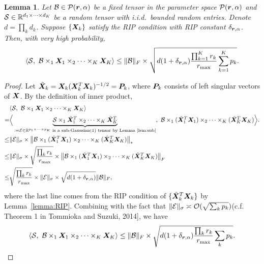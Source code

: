 \documentclass[11pt]{article}
\theoremstyle{plain}
\newtheorem{lem}{Lemma}
\theoremstyle{definition}
\newcommand*{\KeepStyleUnderBrace}[1]{%
  \mathop{%
    \mathchoice
    {\underbrace{\displaystyle#1}}%
    {\underbrace{\textstyle#1}}%
    {\underbrace{\scriptstyle#1}}%
    {\underbrace{\scriptscriptstyle#1}}%
  }\limits
}
\begin{document}
\begin{lem}\label{lem}
Let $\mathcal{B}\in\mathcal{P}(\bm{r},\alpha)$ be a fixed tensor in the parameter space $\mathcal{P}(\bm{r}, \alpha)$ and $\mathcal{S}\in\mathbb{R}^{d_1\times \cdots \times d_K}$ be a random tensor with i.i.d.\ bounded random entries. Denote $d=\prod_k d_k$. Suppose $\{\bm X_k\}$ satisfy the RIP condition with RIP constant $\delta_{\bm{r}, \alpha}$. Then, with very high probability,
\[
\langle \mathcal{S},\ \mathcal{B}\times_1\bm X_1\times_2\cdots\times_K\bm X_K \rangle \leq \lVert\mathcal{B}\rVert_F \times\sqrt{ d(1+\delta_{\bm{r},\alpha}) {\prod_{k=1}^Kr_k \over r_{\max}}\sum_{k=1}^K p_k}.
\]
\end{lem}
\begin{proof}
Let $\tilde {\bm X}_k=\bm X_k(\bm X_k^T\bm X_k)^{-1/2}=\bm{P}_k$, where $\bm{P}_k$ consists of left singular vectors of $\bm X$. By the definition of inner product, 
\begin{align}
&\langle \tS,\ \tB\times_1\mX_1\times_2\cdots\times_K\mX_K \rangle\\
=& \Big\langle \KeepStyleUnderBrace{\tS\times_1\tilde \mX^T_1\times_2\cdots \times_K\tilde \mX^T_K}_{:=\tE\in\mathbb{R}^{p_1\times \cdots\times p_K}\text{ is a sub-Gaussian(1) tensor by Lemma~\ref{lem:sub}}} ,\ \tB\times_1(\tilde \mX^T_1\mX_1)\times_2 \cdots \times_K (\tilde \mX^T_K\mX_K)\Big \rangle.\\
\leq & \snormSize{}{\tE} \times \nnorm{\tB\times_1(\tilde \mX^T_1\mX_1)\times_2 \cdots \times_K (\tilde \mX^T_K\mX_K) } \\
\leq &    \snormSize{}{\tE} \times \sqrt{\prod_k r_k \over r_{\max}}\times \Fnorm{\tB \times_1 (\tilde \mX^T_1\mX_1)\times_2 \cdots \times_K (\tilde \mX^T_K\mX_K)   }\\
\leq & \sqrt{\prod_k r_k \over r_{\max}}\times  \snormSize{}{\tE}\times \sqrt{d(1+\delta_{\mr,\alpha})} \FnormSize{}{\tB},
\end{align}
where the last line comes from the RIP condition of $\{\tilde {\bm X}^T_k\bm X_k\}$ by Lemma~\ref{lemma:RIP}. Combining with the fact that $\lVert\mathcal{E}\rVert_\sigma\asymp \mathcal{O}( \sqrt{\sum_k p_k})$(c.f. Theorem 1 in Tommioka and Suzuki, 2014], we have 
\[
\langle \mathcal{S},\ \mathcal{B}\times_1\bm X_1\times_2\cdots\times_K\bm X_K \rangle\leq \lVert\mathcal{B}\rVert_F\times \sqrt{d(1+\delta_{\bm{r},\alpha}){\prod_k r_k \over r_{\max}}\sum_k p_k}.
\] 
\end{proof}
\end{document}
